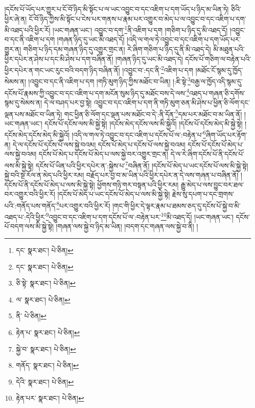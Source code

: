 །དངོས་པོ་ཡོད་པར་གྱུར་པ་ངོ་བོ་ཉིད་མི་སྟོང་པ་ལ་ཡང་འབྱུང་བ་དང་འཇིག་པ་དག་ཡོད་པ་ཉིད་མ་ཡིན་ཏེ། ཅིའི་ཕྱིར་ཞེ་ན། ངོ་བོ་ཉིད་ཀྱིས་མི་སྟོང་པ་ངེས་པར་གནས་པ་རྣམ་པར་འགྱུར་བ་མེད་པ་ལ་འབྱུང་བ་དང་འཇིག་པ་དག་མི་འཐད་པའི་ཕྱིར་རོ། །ཡང་གཞན་ཡང་། འབྱུང་བ་དག་\footnote{དང་  སྣར་ཐང་།  པེ་ཅིན། }ནི་འཇིག་པ་དག །གཅིག་པ་ཉིད་དུ་མི་འཐད་དོ། །འབྱུང་བ་དང་ནི་འཇིག་པ་དག །གཞན་ཉིད་དུ་ཡང་མི་འཐད་དོ། །འདི་ལ་གལ་ཏེ་འབྱུང་བ་དང་འཇིག་པ་དག་ཡོད་པར་གྱུར་ན། གཅིག་པ་ཉིད་དམ་གཞན་ཉིད་དུ་འགྱུར་གྲང་ན། རེ་ཞིག་གཅིག་པ་ཉིད་དུ་ནི་མི་འཐད་དེ། མི་མཐུན་པའི་ཕྱིར་དཔེར་ན་ཤེས་པ་དང་མི་ཤེས་པ་དག་བཞིན་ནོ། །གཞན་ཉིད་དུ་ཡང་མི་འཐད་དེ། དངོས་པོ་གཅིག་ལ་བརྟེན་པའི་ཕྱིར་དཔེར་ན་གང་ཡང་རུང་བའི་བདག་ཉིད་བཞིན་ནོ། །འབྱུང་བ་:དང་ནི་\footnote{དང་  སྣར་ཐང་།  པེ་ཅིན། }འཇིག་པ་དག །མཐོང་ངོ་སྙམ་དུ་ཁྱོད་སེམས་ན། །འབྱུང་བ་དང་ནི་འཇིག་པ་དག །གཏི་མུག་ཉིད་ཀྱིས་མཐོང་བ་ཡིན། །:ཇི་སྟེ་\footnote{ཅི་སྟེ་  སྣར་ཐང་།  པེ་ཅིན། }བརྒྱ་ལ་ཁྱོད་འདི་སྙམ་དུ་དངོས་པོ་རྣམས་ཀྱི་འབྱུང་བ་དང་འཇིག་པ་དག་མངོན་སུམ་ཉིད་དུ་མཐོང་བས་དེ་ལས་\footnote{ལ་  སྣར་ཐང་།  པེ་ཅིན། }འཐད་པ་གཞན་ཅི་དགོས་སྙམ་དུ་སེམས་ན། དེ་ལ་བཤད་པར་བྱ་སྟེ། འབྱུང་བ་དང་འཇིག་པ་དག་ནི་གཏི་མུག་ཅན་མི་ཤེས་པ་ཕྱིན་ཅི་ལོག་དང་ལྡན་པས་མཐོང་བ་ཡིན་ཏེ། གང་ཕྱིན་ཅི་ལོག་དང་ལྡན་པས་མཐོང་བ་དེ་:ནི་དོན་\footnote{ནི་  པེ་ཅིན། }དམ་པར་མཐོང་བ་མ་ཡིན་ནོ། །ཡང་གཞན་ཡང་། དངོས་པོ་དངོས་ལས་མི་སྐྱེ་སྟེ། །དངོས་མེད་དངོས་ལས་མི་སྐྱེའོ། །དངོས་པོ་དངོས་མེད་མི་སྐྱེ་སྟེ། །དངོས་མེད་དངོས་མེད་མི་སྐྱེའོ། །འདི་ལ་གལ་ཏེ་འབྱུང་བ་དང་འཇིག་པ་དངོས་པོ་ལ་:བརྟེན་པ་\footnote{རྟེན་པ་  སྣར་ཐང་།  པེ་ཅིན། }ཞིག་ཡོད་པར་རྟོག་ན། དེ་ལ་དངོས་པོ་དངོས་པོ་ལས་སྐྱེ་བའམ། དངོས་པོ་མེད་པ་དངོས་པོ་ལས་སྐྱེ་བའམ། དངོས་པོ་དངོས་པོ་མེད་པ་ལས་སྐྱེ་བའམ། དངོས་པོ་མེད་པ་དངོས་པོ་མེད་པ་ལས་སྐྱེ་བར་འགྱུར་གྲང་ན། དེ་ལ་རེ་ཞིག་དངོས་པོ་ནི་དངོས་པོ་ལས་མི་སྐྱེ་སྟེ། དངོས་པོ་ཡིན་པའི་ཕྱིར་དཔེར་ན་:སྐྱེས་པ་\footnote{སྐྱེ་བ་  སྣར་ཐང་།  པེ་ཅིན། }བཞིན་ནོ། །དངོས་པོ་མེད་པ་ཡང་དངོས་པོ་ལས་མི་སྐྱེ་སྟེ། སྐྱེ་བའི་སྔ་རོལ་ན་མེད་པའི་ཕྱིར་རམ། བརྗོད་པར་བྱ་བ་མ་ཡིན་པའི་ཕྱིར་དཔེར་ན་དེ་ལས་གཞན་པ་བཞིན་ནོ། །དངོས་པོ་ནི་དངོས་པོ་མེད་པ་ལས་མི་སྐྱེ་སྟེ། ཕྱོགས་གཉི་གར་བསྟན་པའི་ཕྱིར་རམ། རྒྱུ་མེད་པ་ལས་བྱུང་བར་ཐལ་བར་འགྱུར་བའི་ཕྱིར་རོ། །དངོས་པོ་མེད་པ་ཡང་དངོས་པོ་མེད་པ་ལས་མི་སྐྱེ་སྟེ། རྗེས་སུ་དཔག་པ་དང་གྲགས་པའི་:གནོད་པས་གནོད་\footnote{གནོད་  སྣར་ཐང་།  པེ་ཅིན། }པར་འགྱུར་བའི་ཕྱིར་རོ། །གང་གི་ཕྱིར་དེ་ལྟར་རྣམ་པ་ཐམས་ཅད་དུ་དངོས་པོ་སྐྱེ་བ་མི་འཐད་པ་:དེའི་ཕྱིར་\footnote{དེའི་  སྣར་ཐང་།  པེ་ཅིན། }འབྱུང་བ་དང་འཇིག་པ་དག་དངོས་པོ་ལ་:བརྟེན་པར་\footnote{རྟེན་པར་  སྣར་ཐང་།  པེ་ཅིན། }མི་འཐད་དོ། །ཡང་གཞན་ཡང་། དངོས་པོ་བདག་ལས་མི་སྐྱེ་སྟེ། །གཞན་ལས་སྐྱེ་བ་ཉིད་མ་ཡིན། །བདག་དང་གཞན་ལས་སྐྱེ་བ་ནི། །
